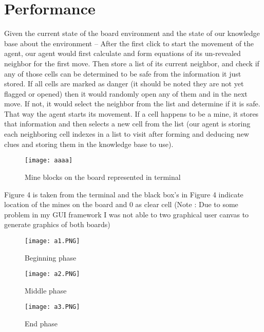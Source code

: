 \documentclass{article}
\begin{document}
\section{Performance}
Given the current state of the board environment and the state of our knowledge base about the environment – After the first click to start the movement of the agent, our agent would first calculate and form equations of its un-revealed neighbor for the first move. Then store a list of its current neighbor, and check if any of those cells can be determined to be safe from the information it just stored. If all cells are marked as danger (it should be noted they are not yet flagged or opened) then it would randomly open any of them and in the next move. If not, it would select the neighbor from the list and determine if it is safe. That way the agent starts its movement. If a cell happens to be a mine, it stores that information and then selects a new cell from the list (our agent is storing each neighboring cell indexes in a list to visit after forming and deducing new clues and storing them in the knowledge base to use).


\begin{figure}[htp]
    \centering
    \texttt{[image: aaaa]}
    \caption{Mine blocks on the board represented in terminal}
    \label{fig:board}
\end{figure}


Figure 4 is taken from the terminal and the black box’s in Figure 4 indicate location of the mines on the board and 0 as clear cell
(Note : Due to some problem in my GUI framework I was not able to two graphical user canvas to generate graphics of both boards)

\begin{figure}[p]
    \centering
    \texttt{[image: a1.PNG]}
        \caption{Beginning phase}
    \label{fig:board}
\end{figure}

\begin{figure}[htp]
    \centering
    \texttt{[image: a2.PNG]}
            \caption{Middle phase}
    \label{fig:board}
\end{figure}

\begin{figure}[htp]
    \centering
    \texttt{[image: a3.PNG]}
            \caption{End phase}
    \label{fig:board}
\end{figure}
\end{document}
